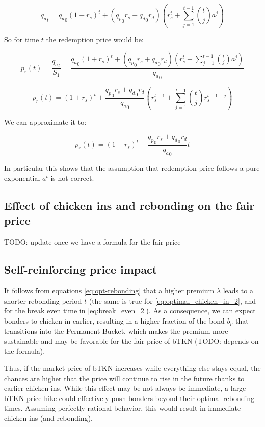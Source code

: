 \documentclass{article}
\begin{document}
\[
{q_a}_t = {q_a}_0(1+r_s)^t + ({q_p}_0 r_s + {q_d}_0 r_d) \left(r_s^t + \sum_{j=1}^{t-1} \binom{t}{j} a^j \right)
\]

So for time $t$ the redemption price would be:

\[
p_r(t) = \frac{{q_a}_t}{S_1} = \frac{{q_a}_0(1+r_s)^t + ({q_p}_0 r_s + {q_d}_0 r_d) \left(r_s^t + \sum_{j=1}^{t-1} \binom{t}{j} a^j \right)}{{q_a}_0}
\]

\begin{equation}
  \label{eq:conservative_p_r_base_2_a}
p_r(t) = (1+r_s)^t + \frac{{q_p}_0 r_s + {q_d}_0 r_d}{{q_a}_0} \left(r_s^{t-1} + \sum_{j=1}^{t-1} \binom{t}{j} r_s^{t-1-j} \right)
\end{equation}

We can approximate it to:

\begin{equation}
  \label{eq:conservative_p_r_base_2_b}
p_r(t) = (1+r_s)^t + \frac{{q_p}_0 r_s + {q_d}_0 r_d}{{q_a}_0} t
\end{equation}

In particular this shows that the assumption that redemption price follows a pure exponential $a^t$ is not correct.

\subsection{Effect of chicken ins and rebonding on the fair price}
TODO: update once we have a formula for the fair price

\subsection{Self-reinforcing price impact}
It follows from equations \ref{eq:opt-rebonding} that a higher premium $\lambda$ leads to a shorter rebonding period $t$ (the same is true for \ref{eq:optimal_chicken_in_2}, and for the break even time in \ref{eq:break_even_2}). As a consequence, we can expect bonders to chicken in earlier, resulting in a higher fraction of the bond $b_p$ that transitions into the Permanent Bucket, which makes the premium more sustainable and may be favorable for the fair price of bTKN (TODO: depends on the formula).

Thus, if the market price of bTKN increases while everything else stays equal, the chances are higher that the price will continue to rise in the future thanks to earlier chicken ins. While this effect may be not always be immediate, a large bTKN price hike could effectively push bonders beyond their optimal rebonding times.
Assuming perfectly rational behavior, this would result in immediate chicken ins (and rebonding).
\end{document}
